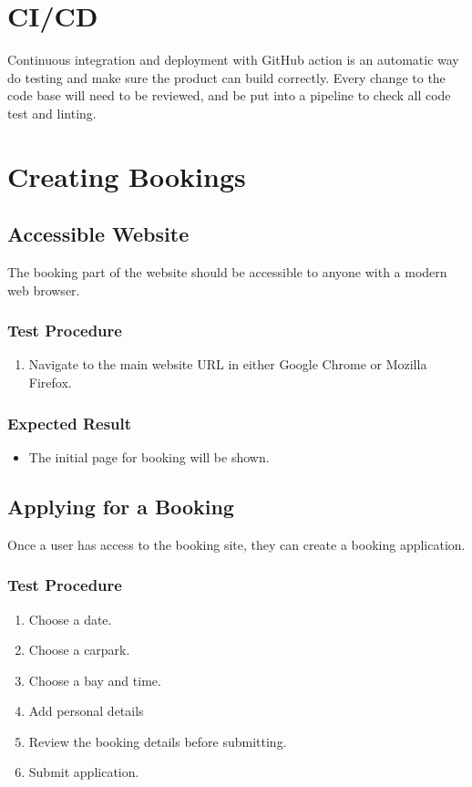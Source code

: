 \documentclass[a4paper, draft]{article}
\begin{document}
\section{CI/CD}
Continuous integration and deployment with GitHub action is an automatic way do testing and make sure the product can build correctly. Every change to the code base will need to be reviewed, and be put into a pipeline to check all code test and linting. 

\newpage
\section{Creating Bookings}
\subsection{Accessible Website}
The booking part of the website should be accessible to anyone with a modern web browser.

\subsubsection{Test Procedure}
\begin{enumerate}
  \item Navigate to the main website URL in either Google Chrome or Mozilla Firefox.
\end{enumerate}

\subsubsection{Expected Result}
\begin{itemize}
  \item The initial page for booking will be shown.
\end{itemize}

\subsection{Applying for a Booking}
Once a user has access to the booking site, they can create a booking application.

\subsubsection{Test Procedure}
\begin{enumerate}
  \item Choose a date.
  \item Choose a carpark.
  \item Choose a bay and time.
  \item Add personal details
  \item Review the booking details before submitting.
  \item Submit application.
\end{enumerate}
\end{document}
